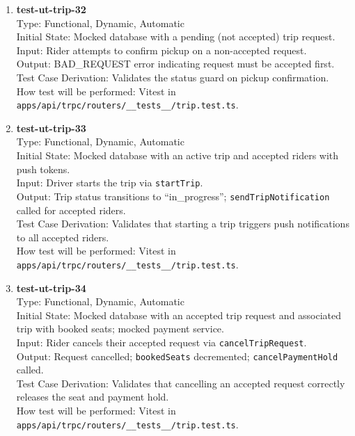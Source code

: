 \documentclass[12pt, titlepage]{article}
\begin{document}
\begin{enumerate}
\item \textbf{test-ut-trip-32}\\
Type: Functional, Dynamic, Automatic\\
Initial State: Mocked database with a pending (not accepted) trip request.\\
Input: Rider attempts to confirm pickup on a non-accepted request.\\
Output: BAD\_REQUEST error indicating request must be accepted first.\\
Test Case Derivation: Validates the status guard on pickup confirmation.\\
How test will be performed: Vitest in \texttt{apps/api/trpc/routers/\_\_tests\_\_/trip.test.ts}.\\

\item \textbf{test-ut-trip-33}\\
Type: Functional, Dynamic, Automatic\\
Initial State: Mocked database with an active trip and accepted riders with push tokens.\\
Input: Driver starts the trip via \texttt{startTrip}.\\
Output: Trip status transitions to ``in\_progress''; \texttt{sendTripNotification} called for accepted riders.\\
Test Case Derivation: Validates that starting a trip triggers push notifications to all accepted riders.\\
How test will be performed: Vitest in \texttt{apps/api/trpc/routers/\_\_tests\_\_/trip.test.ts}.\\

\item \textbf{test-ut-trip-34}\\
Type: Functional, Dynamic, Automatic\\
Initial State: Mocked database with an accepted trip request and associated trip with booked seats; mocked payment service.\\
Input: Rider cancels their accepted request via \texttt{cancelTripRequest}.\\
Output: Request cancelled; \texttt{bookedSeats} decremented; \texttt{cancelPaymentHold} called.\\
Test Case Derivation: Validates that cancelling an accepted request correctly releases the seat and payment hold.\\
How test will be performed: Vitest in \texttt{apps/api/trpc/routers/\_\_tests\_\_/trip.test.ts}.\\
\end{enumerate}
\end{document}
